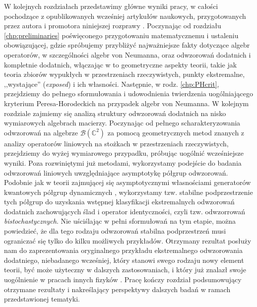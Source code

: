 W kolejnych rozdziałach przedstawimy główne wyniki pracy,
w całości pochodzące z opublikowanych wcześniej artykułów naukowych,
przygotowanych przez autora i promotora niniejszej rozprawy
\cite{miller2014horodeckis,miller2015stable,miller2015topology}.
Poczynając od rozdziału \ref{chp:preliminaries} poświęconego przygotowaniu
matematycznemu i ustaleniu obowiązującej,
gdzie spróbujemy przybliżyć najważniejsze fakty dotyczące algebr operatorów,
w szczególności algebr von Neumanna,
oraz odwzorowań dodatnich i kompletnie dodatnich,
włączając w to geometryczne aspekty teorii,
takie jak teoria zbiorów wypukłych w przestrzeniach rzeczywistych,
punkty ekstremalne, ,,wystające'' (\emph{exposed}) i ich własności.
Następnie,
w rodz. \ref{chp:PHcrit},
przejdziemy do pełnego sformułowania i udowodnienia twierdzenia
uogólniającego kryterium Peresa-Horodeckich na przypadek algebr von Neumanna.
W kolejnym rozdziale zajmiemy się analizą struktury odwzorowań dodatnich na
nisko wymiarowych algebrach macierzy.
Poczynając od pełnego scharakteryzowania odwzorowań na algebrze
$\mathcal{B}(\mathbb{C}^{2})$ za pomocą geometrycznych metod znanych z analizy
operatorów liniowych na stożkach w przestrzeniach rzeczywistych,
przejdziemy do wyżej wymiarowego przypadku,
próbując uogólnić wcześniejsze wyniki.
Poza rozwiniętymi już metodami,
wykorzystamy podejście do badania odwzorowań
liniowych uwzględniające asymptotykę półgrup odwzorowań.
Podobnie jak w teorii
zajmującej się asymptotycznymi własnościami generatorów kwantowych półgrup
dynamicznych \cite{olkiewicz1999environment},
wykorzystamy tzw. stabilne podprzestrzenie tych półgrup do uzyskania
wstępnej klasyfikacji ekstremalnych odwzorowań dodatnich
zachowujących ślad i operator identyczności,
czyli tzw. odwzorrowań \emph{bistochastycznych}.
Nie uściślając w pełni sformułowań na tym etapie,
można powiedzieć,
że dla tego rodzaju odwzorowań stabilna podprzestrzeń musi ograniczać się
tylko do kilku możliwych przykładów.
Otrzymany rezultat posłuży nam do zaprezentowania oryginalnego przykładu
ekstremalnego odwzorowania dodatniego, niebadanego wcześniej,
który stanowi swego rodzaju nowy element teorii,
być może użyteczny w dalszych zastosowaniach,
i który już znalazł swoje uogólnienie w pracach innych fizyków
\cite{rutkowski2015class}.
Pracę kończy rozdział podsumowujący otrzymane rezultaty i nakreślający
perspektywy dalszych badań w ramach przedstawionej tematyki.

